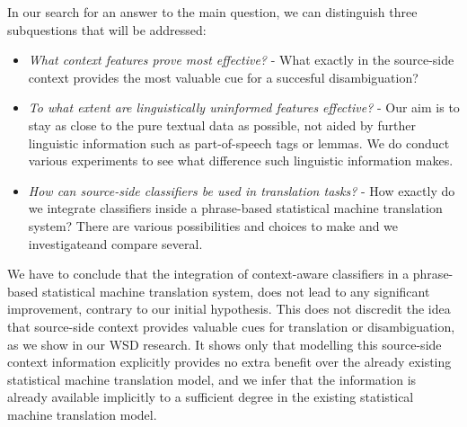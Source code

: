 In our search for an answer to the main question, we can distinguish three subquestions that will be addressed:

\begin{itemize}
\item \emph{What context features prove most effective?} - What exactly in the source-side context provides the most valuable cue for a succesful disambiguation?
\item \emph{To what extent are linguistically uninformed features effective?} -  Our aim is to stay as close to the pure textual data as possible, not aided by further linguistic information such as part-of-speech tags or lemmas. We do conduct various experiments to see what difference such linguistic information makes.
\item \emph{How can source-side classifiers be used in translation tasks?} - How exactly do we integrate classifiers inside a phrase-based statistical machine translation system? There are various possibilities and choices to make and we investigateand compare several.
\end{itemize}

We have to conclude that the integration of context-aware classifiers in a
phrase-based statistical machine translation system, does not lead to any
significant improvement, contrary to our initial hypothesis. This does not
discredit the idea that source-side context provides valuable cues for
translation or disambiguation, as we show in our WSD research.  It shows only
that modelling this source-side context information explicitly provides no
extra benefit over the already existing statistical machine translation model, and we infer
that the information is already available implicitly to a sufficient degree in the
existing statistical machine translation model.


